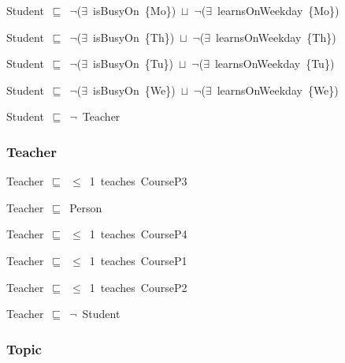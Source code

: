 \documentclass{article}
\begin{document}
Student~\ensuremath{\sqsubseteq}~\ensuremath{\lnot}(\ensuremath{\exists}~isBusyOn~\{Mo\})~\ensuremath{\sqcup}~\ensuremath{\lnot}(\ensuremath{\exists}~learnsOnWeekday~\{Mo\})~

Student~\ensuremath{\sqsubseteq}~\ensuremath{\lnot}(\ensuremath{\exists}~isBusyOn~\{Th\})~\ensuremath{\sqcup}~\ensuremath{\lnot}(\ensuremath{\exists}~learnsOnWeekday~\{Th\})~

Student~\ensuremath{\sqsubseteq}~\ensuremath{\lnot}(\ensuremath{\exists}~isBusyOn~\{Tu\})~\ensuremath{\sqcup}~\ensuremath{\lnot}(\ensuremath{\exists}~learnsOnWeekday~\{Tu\})~

Student~\ensuremath{\sqsubseteq}~\ensuremath{\lnot}(\ensuremath{\exists}~isBusyOn~\{We\})~\ensuremath{\sqcup}~\ensuremath{\lnot}(\ensuremath{\exists}~learnsOnWeekday~\{We\})~

Student~\ensuremath{\sqsubseteq}~\ensuremath{\lnot}~Teacher

\subsubsection*{Teacher}

Teacher~\ensuremath{\sqsubseteq}~\ensuremath{\leq}~1~teaches~CourseP3~

Teacher~\ensuremath{\sqsubseteq}~Person~

Teacher~\ensuremath{\sqsubseteq}~\ensuremath{\leq}~1~teaches~CourseP4~

Teacher~\ensuremath{\sqsubseteq}~\ensuremath{\leq}~1~teaches~CourseP1~

Teacher~\ensuremath{\sqsubseteq}~\ensuremath{\leq}~1~teaches~CourseP2~

Teacher~\ensuremath{\sqsubseteq}~\ensuremath{\lnot}~Student

\subsubsection*{Topic}
\end{document}
